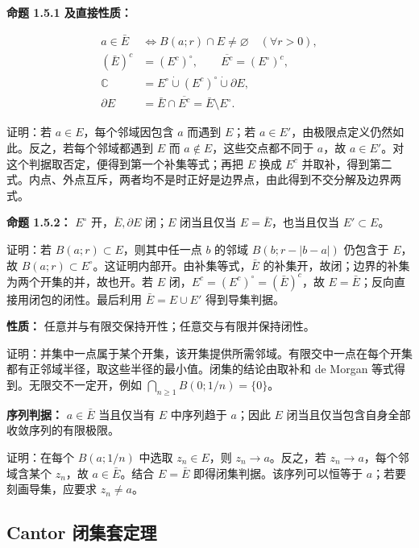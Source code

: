 \documentclass[11pt,a4paper]{article}
\begin{document}
\textbf{命题 1.5.1 及直接性质：}

\[
\begin{aligned}
a\in\bar E&\iff B(a;r)\cap E\ne\varnothing\quad(\forall r>0),\\
(\bar E)^c&=(E^c)^\circ,\qquad
\overline{E^c}=(E^\circ)^c,\\
\mathbb C&=E^\circ\mathbin{\dot\cup}(E^c)^\circ\mathbin{\dot\cup}\partial E,\\
\partial E&=\bar E\cap\overline{E^c}=\bar E\setminus E^\circ.
\end{aligned}
\]

证明：若 \(a\in E\)，每个邻域因包含 \(a\) 而遇到 \(E\)；若
\(a\in E'\)，由极限点定义仍然如此。反之，若每个邻域都遇到 \(E\) 而
\(a\notin E\)，这些交点都不同于 \(a\)，故
\(a\in E'\)。对这个判据取否定，便得到第一个补集等式；再把 \(E\) 换成
\(E^c\)
并取补，得到第二式。内点、外点互斥，两者均不是时正好是边界点，由此得到不交分解及边界两式。

\textbf{命题 1.5.2：} \(E^\circ\) 开，\(\bar E,\partial E\) 闭；\(E\)
闭当且仅当 \(E=\bar E\)，也当且仅当 \(E'\subset E\)。

证明：若 \(B(a;r)\subset E\)，则其中任一点 \(b\) 的邻域 \(B(b;r-|b-a|)\)
仍包含于 \(E\)，故
\(B(a;r)\subset E^\circ\)。这证明内部开。由补集等式，\(\bar E\)
的补集开，故闭；边界的补集为两个开集的并，故也开。若 \(E\)
闭，\(E^c=(E^c)^\circ=(\bar E)^c\)，故
\(E=\bar E\)；反向直接用闭包的闭性。最后利用 \(\bar E=E\cup E'\)
得到导集判据。

\textbf{性质：} 任意并与有限交保持开性；任意交与有限并保持闭性。

证明：并集中一点属于某个开集，该开集提供所需邻域。有限交中一点在每个开集都有正邻域半径，取这些半径的最小值。闭集的结论由取补和
de Morgan 等式得到。无限交不一定开，例如
\(\bigcap_{n\ge1}B(0;1/n)=\{0\}\)。

\textbf{序列判据：} \(a\in\bar E\) 当且仅当有 \(E\) 中序列趋于
\(a\)；因此 \(E\) 闭当且仅当包含自身全部收敛序列的有限极限。

证明：在每个 \(B(a;1/n)\) 中选取 \(z_n\in E\)，则 \(z_n\to a\)。反之，若
\(z_n\to a\)，每个邻域含某个 \(z_n\)，故 \(a\in\bar E\)。结合
\(E=\bar E\) 即得闭集判据。该序列可以恒等于 \(a\)；若要刻画导集，应要求
\(z_n\ne a\)。

\subsection{Cantor
闭集套定理}\label{cantor-ux95edux96c6ux5957ux5b9aux7406}
\end{document}
